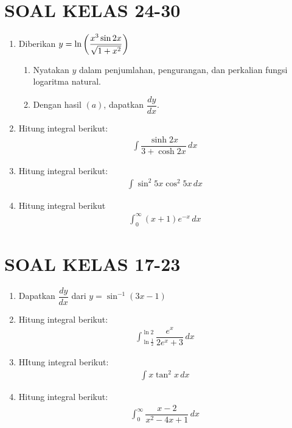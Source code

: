 \documentclass{article}
\begin{document}
\section*{SOAL KELAS 24-30}
\begin{enumerate}
	\item Diberikan $y=\ln\qty(\dfrac{x^3\sin 2x}{\sqrt{1+x^2}})$
	\begin{enumerate}
		\item Nyatakan $y$ dalam penjumlahan, pengurangan, dan perkalian fungsi logaritma natural.
		\item Dengan hasil $(a)$, dapatkan $\dfrac{dy}{dx}$.
	\end{enumerate}
	\item Hitung integral berikut:
	\begin{align*}
		\int \dfrac{\sinh 2x}{3+\cosh 2x}\, dx
	\end{align*}
	\item Hitung integral berikut:
	\begin{align*}
	\int \sin^2 5x\cos^2 5x\, dx
	\end{align*}
	\item Hitung integral berikut 
	\begin{align*}
	\int_0^{\infty} (x+1)e^{-x}\, dx
	\end{align*}
\end{enumerate}
\newpage
\section*{SOAL KELAS 17-23}
\begin{enumerate}
	\item Dapatkan $\dfrac{dy}{dx}$ dari $y=\sin^{-1}(3x-1)$
	\item Hitung integral berikut:
	\begin{align*}
		\int_{\ln \frac{1}{2}}^{\ln 2} \dfrac{e^x}{2e^x+3}\, dx
	\end{align*}
	\item HItung integral berikut:
	\begin{align*}
	\int x\tan^2 x\, dx
	\end{align*}
	\item Hitung integral berikut:
	\begin{align*}
	\int_0^{\infty} \dfrac{x-2}{x^2-4x+1}\, dx
	\end{align*}
\end{enumerate}
\newpage
\end{document}
